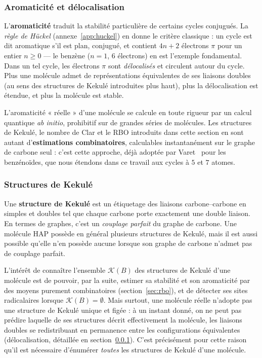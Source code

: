 \documentclass[11pt,a4paper]{article}
\begin{document}
\subsubsection{Aromaticité et délocalisation}
\label{sec:aromaticite}

L'\textbf{aromaticité} traduit la stabilité particulière de certains
cycles conjugués. La \emph{règle de Hückel} (annexe~\ref{app:huckel})
en donne le critère classique : un cycle est dit aromatique s'il est
plan, conjugué, et contient $4n+2$ électrons $\pi$ pour un entier $n
\ge 0$ --- le benzène ($n=1$, $6$ électrons) en est l'exemple
fondamental. Dans un tel cycle, les électrons $\pi$ sont
\emph{délocalisés} et circulent autour du cycle. Plus une molécule
admet de représentations équivalentes de ses liaisons doubles (au sens
des structures de Kekulé introduites plus haut), plus la délocalisation
est étendue, et plus la molécule est stable.

L'aromaticité « réelle » d'une molécule se calcule en toute rigueur par
un calcul quantique \emph{ab initio}, prohibitif sur de grandes séries
de molécules. Les structures de Kekulé, le nombre de Clar et le RBO
introduits dans cette section en sont autant d'\textbf{estimations
combinatoires}, calculables instantanément sur le graphe de carbone seul :
c'est cette approche, déjà adoptée par Varet~\cite{varet2022} pour les
benzénoïdes, que nous étendons dans ce travail aux cycles à $5$ et $7$
atomes.


\subsubsection{Structures de Kekulé}

Une \textbf{structure de Kekulé} est un étiquetage des liaisons carbone--carbone
en simples et doubles tel que chaque carbone porte exactement une double
liaison. En termes de graphes, c'est un \emph{couplage parfait} du graphe
de carbone. Une molécule HAP possède en général plusieurs structures de Kekulé,
mais il est aussi possible qu'elle n'en possède aucune lorsque son graphe
de carbone n'admet pas de couplage parfait.

L'intérêt de connaître l'ensemble $\mathcal{K}(B)$ des structures de
Kekulé d'une molécule est de pouvoir, par la suite, estimer sa stabilité
et son aromaticité par des moyens purement combinatoires
(section~\ref{sec:rbo}), et de détecter ses sites radicalaires lorsque
$\mathcal{K}(B) = \emptyset$. Mais surtout, une molécule réelle n'adopte
pas une structure de Kekulé unique et figée : à un instant donné, on ne
peut pas prédire laquelle de ses structures décrit effectivement la
molécule, les liaisons doubles se redistribuant en permanence entre les
configurations équivalentes (délocalisation, détaillée en
section~\ref{sec:aromaticite}). C'est précisément pour cette raison
qu'il est nécessaire d'énumérer \emph{toutes} les structures de Kekulé
d'une molécule.
\end{document}
